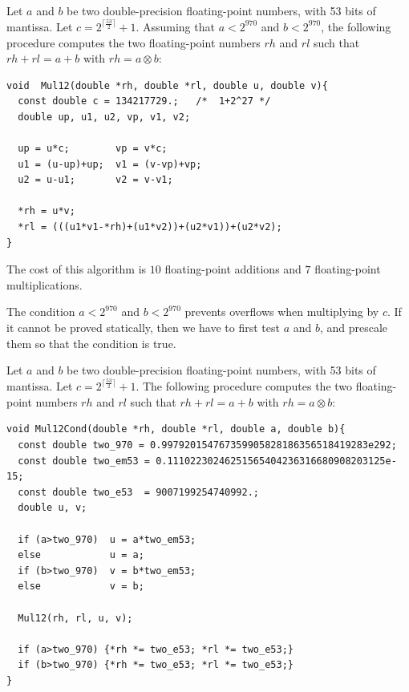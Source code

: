 \begin{theorem}
  Let $a$ and $b$ be two double-precision floating-point numbers, with
  53 bits of mantissa. Let $c=2^{\lceil\frac{ 53}{2} \rceil}+1$.
  Assuming that $a<2^{970}$ and $b<2^{970}$, the following procedure
  computes the two floating-point numbers $rh$ and $rl$ such that $rh
  + rl = a + b$ with $rh = a \otimes b$:
\begin{lstlisting}[label={lst:Mul12},caption={Mul12},firstnumber=1]
void  Mul12(double *rh, double *rl, double u, double v){
  const double c = 134217729.;   /*  1+2^27 */ 
  double up, u1, u2, vp, v1, v2;

  up = u*c;        vp = v*c;
  u1 = (u-up)+up;  v1 = (v-vp)+vp;
  u2 = u-u1;       v2 = v-v1;
  
  *rh = u*v;
  *rl = (((u1*v1-*rh)+(u1*v2))+(u2*v1))+(u2*v2);
}
\end{lstlisting}
\end{theorem}

The cost of this algorithm is $10$ floating-point
additions and $7$ floating-point multiplications.



The condition $a<2^{970}$ and $b<2^{970}$ prevents overflows when
multiplying by $c$. If it cannot be proved statically, then we have to
first test $a$ and $b$, and prescale them so that the condition is
true.


\begin{theorem}
  Let $a$ and $b$ be two double-precision floating-point numbers, with
  53 bits of mantissa. Let $c=2^{\lceil\frac{ 53 }{2}\rceil}+1$.
  The following procedure
  computes the two floating-point numbers $rh$ and $rl$ such that $rh
  + rl = a + b$ with $rh = a \otimes b$:

\begin{lstlisting}[label={lst:Mul12Cond},caption={Mul12Cond},firstnumber=1]
void Mul12Cond(double *rh, double *rl, double a, double b){
  const double two_970 = 0.997920154767359905828186356518419283e292;
  const double two_em53 = 0.11102230246251565404236316680908203125e-15;
  const double two_e53  = 9007199254740992.;
  double u, v;

  if (a>two_970)  u = a*two_em53; 
  else            u = a;
  if (b>two_970)  v = b*two_em53; 
  else            v = b;

  Mul12(rh, rl, u, v);

  if (a>two_970) {*rh *= two_e53; *rl *= two_e53;} 
  if (b>two_970) {*rh *= two_e53; *rl *= two_e53;} 
}\end{lstlisting}
\end{theorem}

